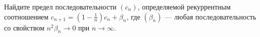 \documentclass{article}
\begin{document}
Найдите предел последовательности $(c_n)$, определяемой рекуррентным соотношением $c_{n+1} = (1-\frac1n)c_n + \beta_n$, где 
$(\beta_n)$ --- любая последовательность со свойством $n^2 \beta_n \to 0$ при $n \to \infty$.
\end{document}
